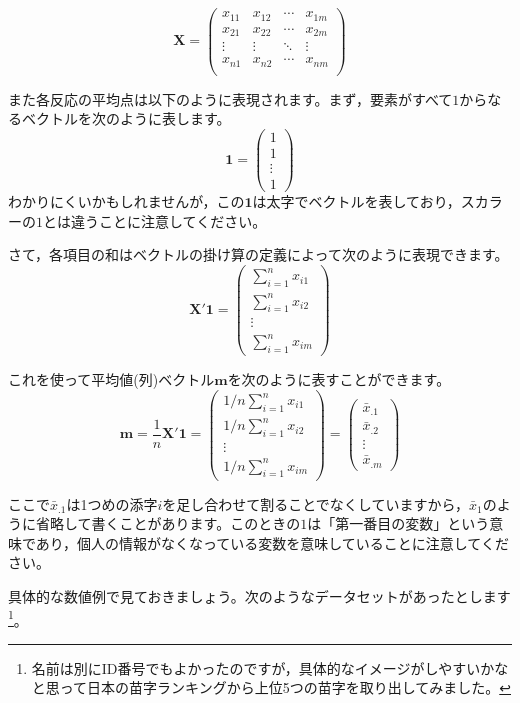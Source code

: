 \documentclass{ltjsbook}
\begin{document}
\[
	\bm{X}=
	\begin{pmatrix}
		x_{11} & x_{12} & \cdots & x_{1m} \\
		x_{21} & x_{22} & \cdots & x_{2m} \\
		\vdots & \vdots & \ddots & \vdots \\
		x_{n1} & x_{n2} & \cdots & x_{nm} \\
	\end{pmatrix}
\]

また各反応の平均点は以下のように表現されます。まず，要素がすべて$1$からなるベクトルを次のように表します。
\[ \bm{1}=\begin{pmatrix} 1 \\ 1 \\ \vdots \\1 \end{pmatrix} \]
わかりにくいかもしれませんが，この$\bm{1}$は太字でベクトルを表しており，スカラーの$1$とは違うことに注意してください。

さて，各項目の和はベクトルの掛け算の定義によって次のように表現できます。
\[ \bm{X}' \bm{1} = \begin{pmatrix} \sum_{i=1}^{n} x_{i1} \\ \sum_{i=1}^{n} x_{i2} \\ \vdots \\ \sum_{i=1}^{n} x_{im} \end{pmatrix} \]


これを使って平均値(列)ベクトル$\bm{m}$を次のように表すことができます。
\[ \bm{m} = \frac{1}{n} \bm{X}' \bm{1} =
	\begin{pmatrix} 1/n\sum_{i=1}^{n} x_{i1} \\ 1/n\sum_{i=1}^{n} x_{i2} \\ \vdots \\ 1/n\sum_{i=1}^{n} x_{im} \end{pmatrix} =
	\begin{pmatrix}\bar{x}_{.1} \\ \bar{x}_{.2}\\ \vdots \\\bar{x}_{.m} \end{pmatrix} \]

ここで$\bar{x}_.1$は1つめの添字$i$を足し合わせて割ることでなくしていますから，$\bar{x}_1$のように省略して書くことがあります。このときの$1$は「第一番目の変数」という意味であり，個人の情報がなくなっている変数を意味していることに注意してください。

具体的な数値例で見ておきましょう。次のようなデータセットがあったとします\footnote{名前は別にID番号でもよかったのですが，具体的なイメージがしやすいかなと思って日本の苗字ランキングから上位5つの苗字を取り出してみました。}。
\end{document}
